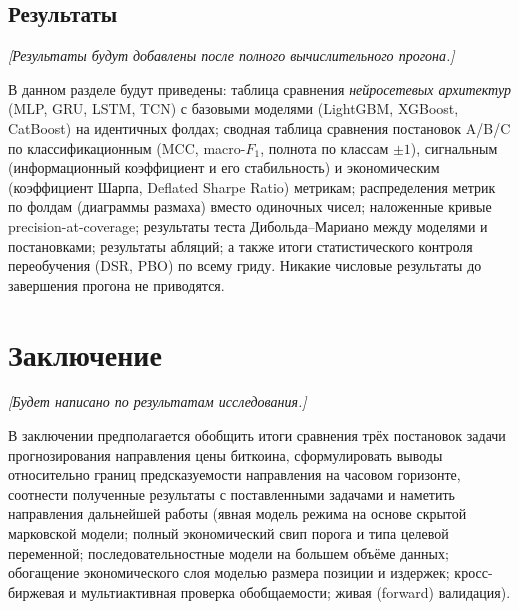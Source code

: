 \documentclass[12pt,a4paper]{report}
\begin{document}
\section{Результаты}
\label{sec:results}

\noindent\emph{[Результаты будут добавлены после полного вычислительного прогона.]}

\medskip
В данном разделе будут приведены: таблица сравнения \emph{нейросетевых архитектур}
(MLP, GRU, LSTM, TCN) с базовыми моделями (LightGBM, XGBoost, CatBoost) на
идентичных фолдах; сводная таблица сравнения постановок A/B/C по классификационным
(MCC, macro-$F_1$, полнота по классам $\pm 1$), сигнальным (информационный
коэффициент и его стабильность) и экономическим (коэффициент Шарпа, Deflated Sharpe
Ratio) метрикам; распределения метрик по фолдам (диаграммы размаха) вместо одиночных
чисел; наложенные кривые precision-at-coverage; результаты теста Дибольда--Мариано
между моделями и постановками; результаты абляций; а также итоги статистического
контроля переобучения (DSR, PBO)
по всему гриду. Никакие числовые результаты до завершения прогона не приводятся.

\chapter*{Заключение}

\noindent\emph{[Будет написано по результатам исследования.]}

\medskip
В заключении предполагается обобщить итоги сравнения трёх постановок задачи
прогнозирования направления цены биткоина, сформулировать выводы относительно
границ предсказуемости направления на часовом горизонте, соотнести полученные
результаты с поставленными задачами и наметить направления дальнейшей работы
(явная модель режима на основе скрытой марковской модели; полный экономический свип
порога и типа целевой переменной; последовательностные модели на большем объёме
данных; обогащение экономического слоя моделью размера позиции и издержек;
кросс-биржевая и мультиактивная проверка обобщаемости; живая (forward) валидация).
\end{document}
